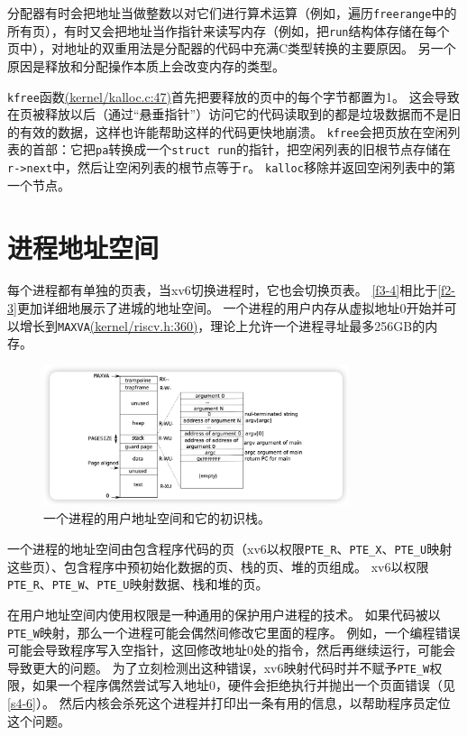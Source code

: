 分配器有时会把地址当做整数以对它们进行算术运算（例如，遍历\texttt{freerange}中的所有页），有时又会把地址当作指针来读写内存（例如，把\texttt{run}结构体存储在每个页中），对地址的双重用法是分配器的代码中充满C类型转换的主要原因。
另一个原因是释放和分配操作本质上会改变内存的类型。

\texttt{kfree}函数\href{https://github.com/mit-pdos/xv6-riscv/blob/riscv//kernel/kalloc.c#L47}{(kernel/kalloc.c:47)}首先把要释放的页中的每个字节都置为1。
这会导致在页被释放以后（通过“悬垂指针”）访问它的代码读取到的都是垃圾数据而不是旧的有效的数据，这样也许能帮助这样的代码更快地崩溃。
\texttt{kfree}会把页放在空闲列表的首部：它把\texttt{pa}转换成一个\texttt{struct run}的指针，把空闲列表的旧根节点存储在\texttt{r->next}中，然后让空闲列表的根节点等于\texttt{r}。
\texttt{kalloc}移除并返回空闲列表中的第一个节点。

\section{进程地址空间}
每个进程都有单独的页表，当xv6切换进程时，它也会切换页表。
\autoref{f3-4}相比于\autoref{f2-3}更加详细地展示了进城的地址空间。
一个进程的用户内存从虚拟地址0开始并可以增长到\texttt{MAXVA}\href{https://github.com/mit-pdos/xv6-riscv/blob/riscv//kernel/riscv.h#L360}{(kernel/riscv.h:360)}，理论上允许一个进程寻址最多256GB的内存。

\begin{figure}[htbp]
    \centering
    \includegraphics[width=0.8\textwidth]{../imgs/f3-4.png}
    \caption{一个进程的用户地址空间和它的初识栈。}
    \label{f3-4}
\end{figure}

一个进程的地址空间由包含程序代码的页（xv6以权限\texttt{PTE\_R}、\texttt{PTE\_X}、\texttt{PTE\_U}映射这些页）、包含程序中预初始化数据的页、栈的页、堆的页组成。
xv6以权限\texttt{PTE\_R}、\texttt{PTE\_W}、\texttt{PTE\_U}映射数据、栈和堆的页。

在用户地址空间内使用权限是一种通用的保护用户进程的技术。
如果代码被以\texttt{PTE\_W}映射，那么一个进程可能会偶然间修改它里面的程序。
例如，一个编程错误可能会导致程序写入空指针，这回修改地址0处的指令，然后再继续运行，可能会导致更大的问题。
为了立刻检测出这种错误，xv6映射代码时并不赋予\texttt{PTE\_W}权限，如果一个程序偶然尝试写入地址0，硬件会拒绝执行并抛出一个页面错误（见\autoref{s4-6}）。
然后内核会杀死这个进程并打印出一条有用的信息，以帮助程序员定位这个问题。

